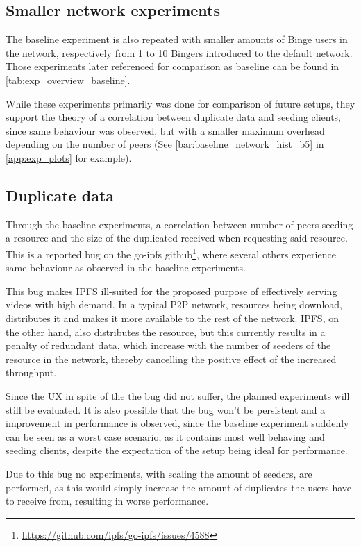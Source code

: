 \subsection{Smaller network experiments}
The baseline experiment is also repeated with smaller amounts of Binge users in the network, respectively from 1 to 10 Bingers introduced to the default network. Those experiments later referenced for comparison as baseline can be found in \autoref{tab:exp_overview_baseline}.

While these experiments primarily was done for comparison of future setups, they support the theory of a correlation between duplicate data and seeding clients, since same behaviour was observed, but with a smaller maximum overhead depending on the number of peers (See \autoref{bar:baseline_network_hist_b5} in \autoref{app:exp_plots} for example).

\subsection{Duplicate data}
\label{sec:eval_bug_dup}
Through the baseline experiments, a correlation between number of peers seeding a resource and the size of the duplicated received when requesting said resource. This is a reported bug on the go-ipfs github\footnote{\url{https://github.com/ipfs/go-ipfs/issues/4588}}, where several others experience same behaviour as observed in the baseline experiments.

This bug makes \ac{IPFS} ill-suited for the proposed purpose of effectively serving videos with high demand. In a typical \ac{P2P} network, resources being download, distributes it and makes it more available to the rest of the network. \ac{IPFS}, on the other hand, also distributes the resource, but this currently results in a penalty of redundant data, which increase with the number of seeders of the resource in the network, thereby cancelling the positive effect of the increased throughput.

Since the \ac{UX} in spite of the the bug did not suffer, the planned experiments will still be evaluated. It is also possible that the bug won't be persistent and a improvement in performance is observed, since the baseline experiment suddenly can be seen as a worst case scenario, as it contains most well behaving and seeding clients, despite the expectation of the setup being ideal for performance.

Due to this bug no experiments, with scaling the amount of seeders, are performed, as this would simply increase the amount of duplicates the users have to receive from, resulting in worse performance.

